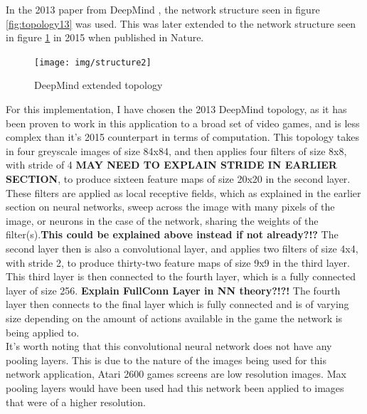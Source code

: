 \documentclass[10pt]{article}
\begin{document}
		In the 2013 paper from DeepMind \cite{ataridrl}, the network structure seen in figure \ref{fig:topology13} was used. This was later extended to the network structure seen in figure \ref{fig:topology15} in 2015 when published in Nature.\\
		
		\begin{figure}[h]				
			\texttt{[image: img/structure2]}
			\centering
			\caption{DeepMind extended topology}
			\label{fig:topology15}
		\end{figure}
		
		For this implementation, I have chosen the 2013 DeepMind topology, as it has been proven to work in this application to a broad set of video games, and is less complex than it's 2015 counterpart in terms of computation. This topology takes in four greyscale images of size 84x84, and then applies four filters of size 8x8, with stride of 4 \textbf{MAY NEED TO EXPLAIN STRIDE IN EARLIER SECTION}, to produce sixteen feature maps of size 20x20 in the second layer. These filters are applied as local receptive fields, which as explained in the earlier section on neural networks, sweep across the image with many pixels of the image, or neurons in the case of the network, sharing the weights of the filter(s).\textbf{This could be explained above instead if not already?!?} The second layer then is also a convolutional layer, and applies two filters of size 4x4, with stride 2, to produce thirty-two feature maps of size 9x9 in the third layer. This third layer is then connected to the fourth layer, which is a fully connected layer of size 256. \textbf{Explain FullConn Layer in NN theory?!?!} The fourth layer then connects to the final layer which is fully connected and is of varying size depending on the amount of actions available in the game the network is being applied to.\\
		
		It's worth noting that this convolutional neural network does not have any pooling layers. This is due to the nature of the images being used for this network application, Atari 2600 games screens are low resolution images. Max pooling layers would have been used had this network been applied to images that were of a higher resolution.
		
\end{document}
